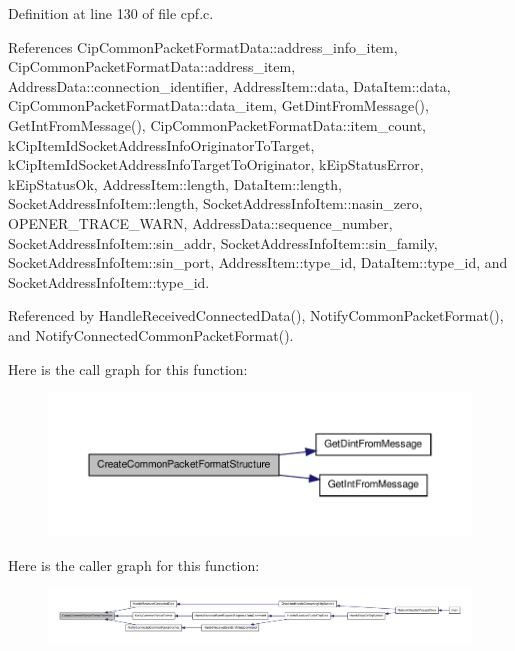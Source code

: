 \-Definition at line 130 of file cpf.\-c.



\-References \-Cip\-Common\-Packet\-Format\-Data\-::address\-\_\-info\-\_\-item, \-Cip\-Common\-Packet\-Format\-Data\-::address\-\_\-item, \-Address\-Data\-::connection\-\_\-identifier, \-Address\-Item\-::data, \-Data\-Item\-::data, \-Cip\-Common\-Packet\-Format\-Data\-::data\-\_\-item, \-Get\-Dint\-From\-Message(), \-Get\-Int\-From\-Message(), \-Cip\-Common\-Packet\-Format\-Data\-::item\-\_\-count, k\-Cip\-Item\-Id\-Socket\-Address\-Info\-Originator\-To\-Target, k\-Cip\-Item\-Id\-Socket\-Address\-Info\-Target\-To\-Originator, k\-Eip\-Status\-Error, k\-Eip\-Status\-Ok, \-Address\-Item\-::length, \-Data\-Item\-::length, \-Socket\-Address\-Info\-Item\-::length, \-Socket\-Address\-Info\-Item\-::nasin\-\_\-zero, \-O\-P\-E\-N\-E\-R\-\_\-\-T\-R\-A\-C\-E\-\_\-\-W\-A\-R\-N, \-Address\-Data\-::sequence\-\_\-number, \-Socket\-Address\-Info\-Item\-::sin\-\_\-addr, \-Socket\-Address\-Info\-Item\-::sin\-\_\-family, \-Socket\-Address\-Info\-Item\-::sin\-\_\-port, \-Address\-Item\-::type\-\_\-id, \-Data\-Item\-::type\-\_\-id, and \-Socket\-Address\-Info\-Item\-::type\-\_\-id.



\-Referenced by \-Handle\-Received\-Connected\-Data(), \-Notify\-Common\-Packet\-Format(), and \-Notify\-Connected\-Common\-Packet\-Format().



\-Here is the call graph for this function\-:
\nopagebreak
\begin{figure}[H]
\begin{center}
\leavevmode
\includegraphics[width=350pt]{d4/d91/group__ENCAP_ga5fd76bfeb985480d68d6fd4d97129606_cgraph}
\end{center}
\end{figure}




\-Here is the caller graph for this function\-:
\nopagebreak
\begin{figure}[H]
\begin{center}
\leavevmode
\includegraphics[width=350pt]{d4/d91/group__ENCAP_ga5fd76bfeb985480d68d6fd4d97129606_icgraph}
\end{center}
\end{figure}


